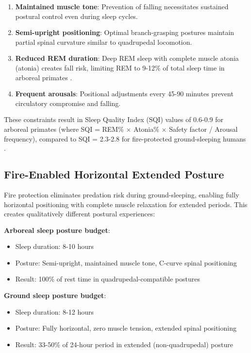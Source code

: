 \documentclass[12pt,a4paper]{article}
\begin{document}
\begin{enumerate}
\item \textbf{Maintained muscle tone}: Prevention of falling necessitates sustained postural control even during sleep cycles.
\item \textbf{Semi-upright positioning}: Optimal branch-grasping postures maintain partial spinal curvature similar to quadrupedal locomotion.
\item \textbf{Reduced REM duration}: Deep REM sleep with complete muscle atonia (atonia) creates fall risk, limiting REM to 9-12\% of total sleep time in arboreal primates \citep{capellini2008phylogenetic}.
\item \textbf{Frequent arousals}: Positional adjustments every 45-90 minutes prevent circulatory compromise and falling.
\end{enumerate}

These constraints result in Sleep Quality Index (SQI) values of 0.6-0.9 for arboreal primates (where SQI = REM\% $\times$ Atonia\% $\times$ Safety factor / Arousal frequency), compared to SQI = 2.3-2.8 for fire-protected ground-sleeping humans \citep{rattenborg2012sleep}.

\subsection{Fire-Enabled Horizontal Extended Posture}

Fire protection eliminates predation risk during ground-sleeping, enabling fully horizontal positioning with complete muscle relaxation for extended periods. This creates qualitatively different postural experiences:

\textbf{Arboreal sleep posture budget}:
\begin{itemize}
\item Sleep duration: 8-10 hours
\item Posture: Semi-upright, maintained muscle tone, C-curve spinal positioning
\item Result: 100\% of rest time in quadrupedal-compatible postures
\end{itemize}

\textbf{Ground sleep posture budget}:
\begin{itemize}
\item Sleep duration: 8-12 hours
\item Posture: Fully horizontal, zero muscle tension, extended spinal positioning
\item Result: 33-50\% of 24-hour period in extended (non-quadrupedal) posture
\end{itemize}
\end{document}
